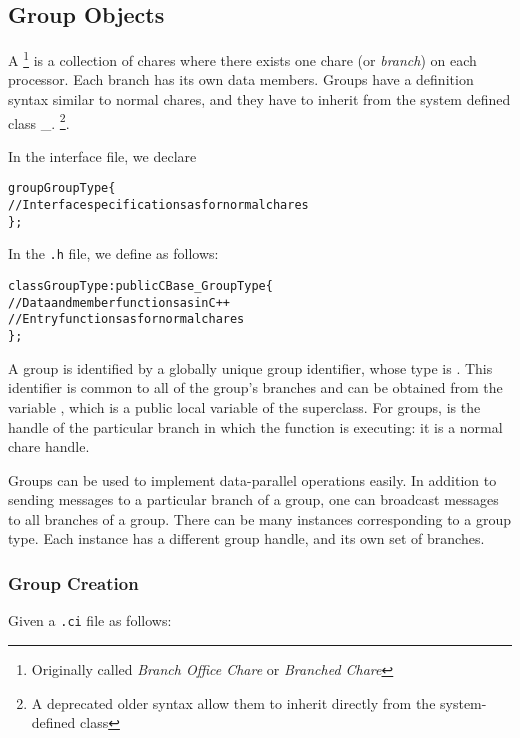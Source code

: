 \subsection{Group Objects}

\label{sec:group}

A \footnote{Originally called {\em Branch Office Chare} or 
{\em Branched Chare}} is a collection of chares where 
there exists one chare (or {\sl branch}) on each
processor.   Each branch has its own data members.  Groups have
a definition syntax similar to normal chares,
and they have to inherit from the system defined class \_.
\footnote{A deprecated older syntax allow them to inherit directly from the
system-defined class }.

In the interface file, we declare

\begin{alltt}
 group GroupType \{
   // Interface specifications as for normal chares
 \};
\end{alltt}

In the \texttt{.h} file, we define  as follows:

\begin{alltt}
 class GroupType : public CBase\_GroupType \{
  // Data and member functions as in C++
  // Entry functions as for normal chares
 \};
\end{alltt}

A group is identified by a globally unique group identifier, whose type is
. This identifier is common to all of the group's branches and
can be obtained from the variable , which is a public local
variable of the  superclass.  For groups,  is the
handle of the particular branch in which the function is executing: it is a
normal chare handle.

Groups can be used to implement data-parallel operations easily.  In addition
to sending messages to a particular branch of a group, one can broadcast
messages to all branches of a group.  There can be many instances corresponding
to a group type.  Each instance has a different group handle, and its own set
of branches.

\subsubsection{Group Creation}

Given a \texttt{.ci} file as follows:

